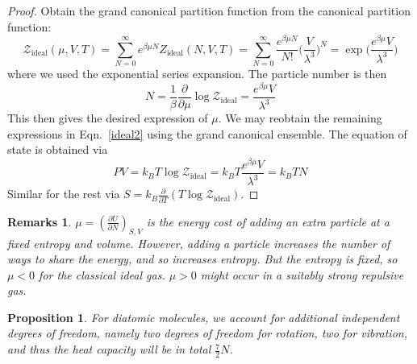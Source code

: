 \documentclass[a4paper]{article}
\newtheorem{remarks}{Remarks}[section]
\theoremstyle{new}
\newtheorem{prop}{Proposition}[section]
\begin{document}
\begin{proof}
Obtain the grand canonical partition function from the canonical partition function:
$$\mathcal{Z}_{\text{ideal}}(\mu,V,T)=\sum_{N=0}^\infty e^{\beta\mu N}Z_{\text{ideal}}(N,V,T)=\sum_{N=0}^\infty 
\frac{e^{\beta\mu N}}{N!}\bigg(\frac{V}{\lambda^3}\bigg)^N=\exp\bigg(\frac{e^{\beta\mu }V}{\lambda^3}\bigg)$$
where we used the exponential series expansion. The particle number is then
$$N=\frac{1}{\beta}\frac{\partial}{\partial\mu}\log\mathcal{Z}_{\text{ideal}}=\frac{e^{\beta\mu }V}{\lambda^3}$$
This then gives the desired expression of $\mu$. We may reobtain the remaining expressions in Eqn.~\ref{ideal2} using the grand canonical ensemble. The equation of state is obtained via
$$PV=k_BT\log\mathcal{Z}_{\text{ideal}}=k_BT\frac{e^{\beta\mu}V}{\lambda^3}=k_BTN$$
Similar for the rest via $S=k_B\frac{\partial}{\partial T}(T\log\mathcal{Z}_{\text{ideal}})$.
\end{proof}
\begin{remarks}
$\mu=(\frac{\partial U}{\partial N})_{S,V}$ is the energy cost of adding an extra particle at a fixed entropy and volume. However, adding a particle increases the number of ways to share the energy, and so increases entropy. But the entropy is fixed, so $\mu<0$ for the classical ideal gas. $\mu>0$ might occur in a suitably strong repulsive gas.
\end{remarks}
\begin{prop}
For diatomic molecules, we account for additional independent degrees of freedom, namely two degrees of freedom for rotation, two for vibration, and thus the heat capacity will be in total $\frac{7}{2}N$.
\end{prop}
\end{document}
